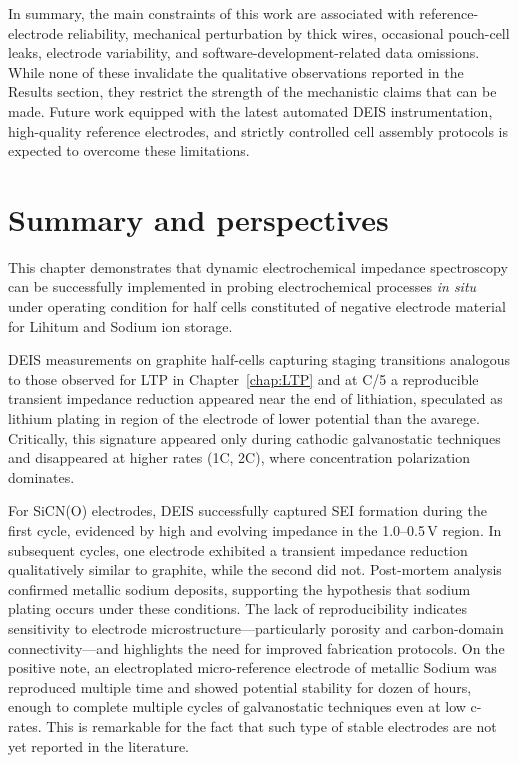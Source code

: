 In summary, the main constraints of this work are associated with reference-electrode reliability, mechanical perturbation by thick wires, occasional pouch-cell leaks, electrode variability, and software-development-related data omissions. While none of these invalidate the qualitative observations reported in the Results section, they restrict the strength of the mechanistic claims that can be made. Future work equipped with the latest automated DEIS instrumentation, high-quality reference electrodes, and strictly controlled cell assembly protocols is expected to overcome these limitations.


\section{Summary and perspectives}

This chapter demonstrates that dynamic electrochemical impedance spectroscopy can be successfully implemented in probing electrochemical processes \emph{in situ} under operating condition for half cells constituted of negative electrode material for Lihitum and Sodium ion storage.

DEIS measurements on graphite half-cells capturing staging transitions analogous to those observed for LTP in Chapter~\ref{chap:LTP} and at C/5 a reproducible transient impedance reduction appeared near the end of lithiation, speculated as lithium plating in region of the electrode of lower potential than the avarege.
Critically, this signature appeared only during cathodic galvanostatic techniques and disappeared at higher rates (1C, 2C), where concentration polarization dominates.

For SiCN(O) electrodes, DEIS successfully captured SEI formation during the first cycle, evidenced by high and evolving impedance in the 1.0--0.5\,V region. 
In subsequent cycles, one electrode exhibited a transient impedance reduction qualitatively similar to graphite, while the second did not. 
Post-mortem analysis confirmed metallic sodium deposits, supporting the hypothesis that sodium plating occurs under these conditions. 
The lack of reproducibility indicates sensitivity to electrode microstructure—particularly porosity and carbon-domain connectivity—and highlights the need for improved fabrication protocols.
On the positive note, an electroplated micro-reference electrode of metallic Sodium was reproduced multiple time and showed potential stability for dozen of hours, enough to complete multiple cycles of galvanostatic techniques even at low c-rates.
This is remarkable for the fact that such type of stable electrodes are not yet reported in the literature.

